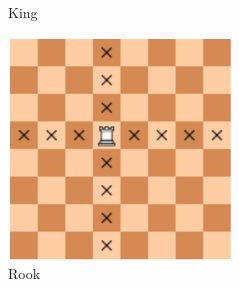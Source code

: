 \documentclass{article}
\begin{document}
\begin{figure}[!htb]
  \caption{King}\label{fig:chess2}
\endminipage\hfill
{}%
  \includegraphics[width=\linewidth]{chess3}
  \caption{Rook}\label{fig:chess3}
\endminipage
\end{figure}
\end{document}
